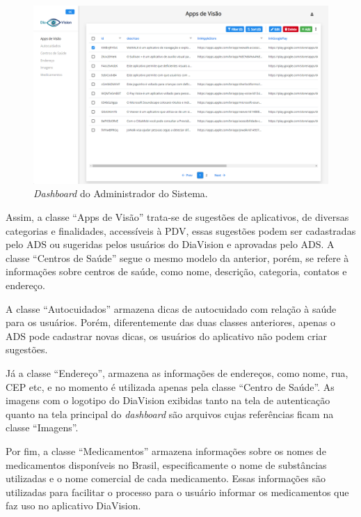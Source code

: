 \begin{figure}[htb]
    \caption{\label{fig_back_dash_apps}\emph{Dashboard} do Administrador do Sistema.}
    \begin{center}
        \includegraphics[scale=0.39]{Imagens/desenvolvimento/apps_visao_admin.png}
    \end{center}
\end{figure}

Assim, a classe ``Apps de Visão'' trata-se de sugestões de aplicativos, de diversas categorias e finalidades, accessíveis
à PDV, essas sugestões podem ser cadastradas pelo ADS ou sugeridas pelos usuários do DiaVision e aprovadas pelo ADS. A
classe ``Centros de Saúde'' segue o mesmo modelo da anterior, porém, se refere à informações sobre centros de saúde, como
nome, descrição, categoria, contatos e endereço.

A classe ``Autocuidados'' armazena dicas de autocuidado com relação à saúde para os usuários. Porém, diferentemente das duas
classes anteriores, apenas o ADS pode cadastrar novas dicas, os usuários do aplicativo não podem criar sugestões.

Já a classe ``Endereço'', armazena as informações de endereços, como nome, rua, CEP etc, e no momento é utilizada apenas
pela classe ``Centro de Saúde''. As imagens com o logotipo do DiaVision exibidas tanto na tela de autenticação quanto na
tela principal do \emph{dashboard} são arquivos cujas referências ficam na classe ``Imagens''.

Por fim, a classe ``Medicamentos'' armazena informações sobre os nomes de medicamentos disponíveis no Brasil, especificamente
o nome de substâncias utilizadas e o nome comercial de cada medicamento. Essas informações são utilizadas para facilitar
o processo para o usuário informar os medicamentos que faz uso no aplicativo DiaVision.

